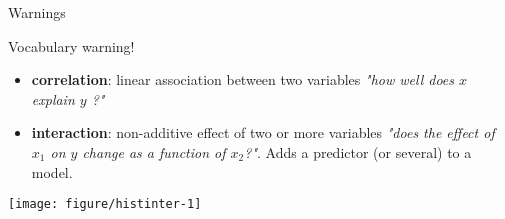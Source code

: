 \documentclass[10pt]{beamer}\usepackage[]{graphicx}\usepackage[]{color}
\newenvironment{knitrout}{}{} %
\begin{document}
\begin{frame}[fragile]{Warnings}

  \begin{alertblock}{Vocabulary warning!}
    \begin{itemize}[<+->]
      \item \textbf{correlation}: linear association between two variables \textit{"how well does $x$ explain $y$ ?"}
      \item \textbf{interaction}: non-additive effect of two or more variables \textit{"does the effect of $x_1$ on $y$ change as a function of $x_2$?"}. Adds a predictor (or several) to a model.
    \end{itemize}
  \end{alertblock}

\pause
\begin{knitrout}\small
{}\color{fgcolor}
\texttt{[image: figure/histinter-1]} 

\end{knitrout}
\end{frame}
\end{document}
